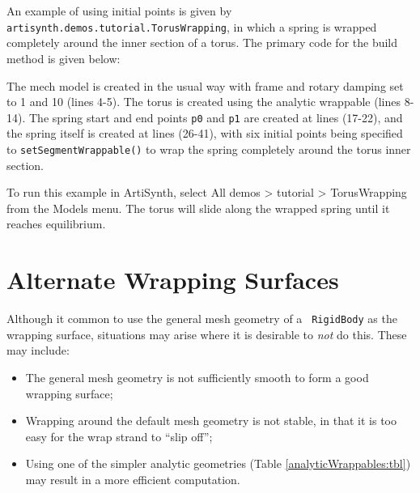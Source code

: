 An example of using initial points is given by {\tt
artisynth.demos.tutorial.TorusWrapping}, in which a spring
is wrapped completely around the inner section of a torus.
The primary code for
the build method is given below: 
\lstset{numbers=left}
\iflatexml

\else

\fi
\lstset{numbers=none}

The mech model is created in the usual way with frame and rotary
damping set to 1 and 10 (lines 4-5). The torus is created using the
analytic wrappable  (lines 8-14). The
spring start and end points {\tt p0} and {\tt p1} are created at lines
(17-22), and the spring itself is created at lines (26-41), with six
initial points being specified to {\tt setSegmentWrappable()} to wrap
the spring completely around the torus inner section.

To run this example in ArtiSynth, select {\sf All demos > tutorial >
TorusWrapping} from the {\sf Models} menu. The torus will slide along
the wrapped spring until it reaches equilibrium.

\section{Alternate Wrapping Surfaces}
\label{AlternateWrappingSurfaces:sec}

Although it common to use the general mesh geometry of a {\tt
RigidBody} as the wrapping surface, situations may arise where it is
desirable to {\it not} do this. These may include:

\begin{itemize}

\item The general mesh geometry is not sufficiently smooth
to form a good wrapping surface;

\item Wrapping around the default mesh geometry is not stable, in
that it is too easy for the wrap strand to ``slip off'';

\item Using one of the simpler analytic geometries
(Table \ref{analyticWrappables:tbl}) may result in a more efficient
computation.

\end{itemize}

